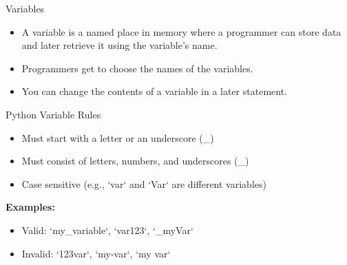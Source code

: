 \documentclass[serif, aspectratio=169]{beamer}
\begin{document}
\begin{frame}{Variables}
    \begin{itemize}[<+-| alert@+>] %
        \item A variable is a named place in memory where a programmer can store data and later retrieve it using the variable's name.
        \item Programmers get to choose the names of the variables.
        \item You can change the contents of a variable in a later statement.
    \end{itemize}
\end{frame}

\begin{frame}{Python Variable Rules}
    \begin{itemize}[<+-| alert@+>] %
        \item Must start with a letter or an underscore (\_)
        \item Must consist of letters, numbers, and underscores (\_)
        \item Case sensitive (e.g., `var` and `Var` are different variables)
    \end{itemize}
    \vspace{0.5cm}
    \textbf{Examples:}
    \begin{itemize}
        \item Valid: `my\_variable`, `var123`, `\_myVar` \\
        \item Invalid: `123var`, `my-var`, `my var`
    \end{itemize}
\end{frame}
\end{document}
